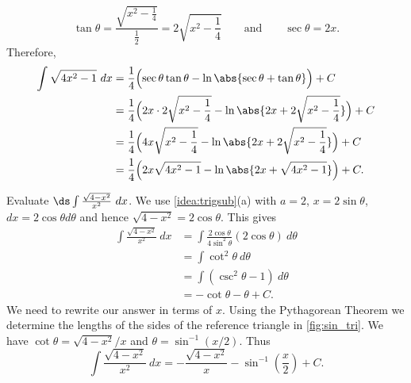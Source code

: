 \begin{example}
\[\tan \theta = \frac{\sqrt{x^2-\frac14}}{\frac12} = 2\sqrt{x^2-\frac14}\qquad \text{and}\qquad\sec\theta = 2x.\]
Therefore,
\begin{align*}
	\int \sqrt{4x^2-1}\ dx
	& =\frac14\Bigl(\sec\theta\tan\theta -\ln\abs{\sec\theta+\tan\theta}\Bigr)+C \\
	&=\frac14\Bigl(2x\cdot 2\sqrt{x^2-\frac14} - \ln\abs{2x + 2\sqrt{x^2-\frac14}}\Bigr)+C\\
	&= \frac14\Bigl(4x\sqrt{x^2-\frac14}-\ln\abs{2x + 2\sqrt{x^2-\frac14}}\Bigr)+C \\
	& = \frac14\Bigl(2x\sqrt{4x^2-1} - \ln\abs{2x + \sqrt{4x^2-1}}\Bigr)+C.
\end{align*}
\end{example}

\begin{example}\label{ex_trigsub4}
Evaluate $\ds \int \frac{\sqrt{4-x^2}}{x^2}\ dx$.
\solution
We use \autoref{idea:trigsub}(a) with $a=2$, $x=2\sin \theta$, $dx = 2\cos \theta d\theta$ and hence $\sqrt{4-x^2} = 2\cos\theta$. This gives
\begin{align*}
\int \frac{\sqrt{4-x^2}}{x^2}\ dx &= \int \frac{2\cos\theta}{4\sin^2\theta}(2\cos\theta)\ d\theta\\
		&= \int \cot^2\theta\ d\theta\\
		&=	\int (\csc^2\theta -1)\ d\theta\\
		&= -\cot\theta -\theta + C.
\end{align*}
We need to rewrite our answer in terms of $x$. Using the Pythagorean Theorem we determine the lengths of the sides of the reference triangle in \autoref{fig:sin_tri}. We have $\cot\theta = \sqrt{4-x^2}/x$ and $\theta = \sin^{-1}(x/2)$. Thus
\[\int \frac{\sqrt{4-x^2}}{x^2}\ dx = -\frac{\sqrt{4-x^2}}x-\sin^{-1}\left(\frac x2\right) + C.\]
\end{example}

